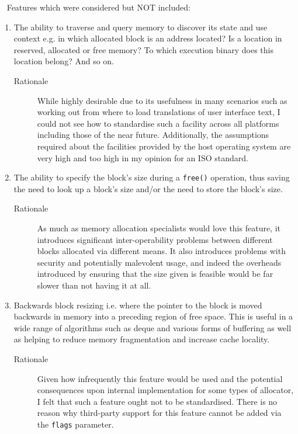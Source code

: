 \documentclass[wd]{isov2}
\begin{document}
{\begin{introduction}
~ \linebreak
Features which were considered but NOT included:
\begin{enumerate}
\item The ability to traverse and query memory to discover its state and use context e.g. in which allocated block is an address located? Is a location in reserved, allocated or free memory? To which execution binary does this location belong? And so on.
\begin{description}
\item[Rationale] While highly desirable due to its usefulness in many scenarios such as working out from where to load translations of user interface text, I could not see how to standardise such a facility across all platforms including those of the near future. Additionally, the assumptions required about the facilities provided by the host operating system are very high and too high in my opinion for an ISO standard.
\end{description}
\item The ability to specify the block's size during a \texttt{free()} operation, thus saving the need to look up a block's size and/or the need to store the block's size.
\begin{description}
\item[Rationale] As much as memory allocation specialists would love this feature, it introduces significant inter-operability problems between different blocks allocated via different means. It also introduces problems with security and potentially malevolent usage, and indeed the overheads introduced by ensuring that the size given is feasible would be far slower than not having it at all.
\end{description}
\item Backwards block resizing i.e. where the pointer to the block is moved backwards in memory into a preceding region of free space. This is useful in a wide range of algorithms such as deque and various forms of buffering as well as helping to reduce memory fragmentation and increase cache locality.
\begin{description}
\item[Rationale] Given how infrequently this feature would be used and the potential consequences upon internal implementation for some types of allocator, I felt that such a feature ought not to be standardised. There is no reason why third-party support for this feature cannot be added via the \texttt{flags} parameter.
\end{description}

\end{enumerate}
\end{introduction}}
\end{document}
